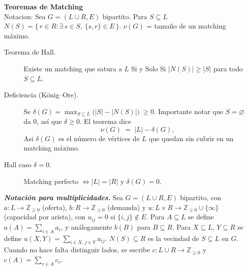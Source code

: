 \textbf{Teoremas de Matching}\\
Notacion:  Sea $G=(L\cup R,E)$ bipartito. Para $S\subseteq L$
    $ N(S)=\{\,r\in R : \exists\, s\in S,\ \{s,r\}\in E\,\} $.
    $\nu(G)$ = tama\~no de un matching m\'aximo. 



\begin{description}
\item[Teorema de Hall.]
    Existe un matching que satura a $L$
    Si y Solo Si $|N(S)|\ge |S|$ para todo $S\subseteq L$.
\item[Deficiencia (K\"onig--Ore).] Se $
    \delta(G)=\max_{S\subseteq L}\bigl(|S|-|N(S)|\bigr)\ \ge 0 $. Importante notar que $S=\varnothing$ da $0$, as\'i que $\delta\ge 0$. El teorema dice
    \[
    \nu(G)\;=\;|L|-\delta(G),
    \]
    Asi $\delta(G)$ es el n\'umero de
    v\'ertices de $L$ que quedan sin cubrir en un matching m\'aximo.
\item[Hall caso $\delta = 0$.] Matching perfecto $\iff |L|=|R|$ y $\delta(G)=0$.\\
\end{description}



\textit{\textbf{Notaci\'on para multiplicidades.}}
Sea $G=(L\cup R,E)$ bipartito, con $a:L\to\mathbb{Z}_{\ge0}$ (oferta),
$b:R\to\mathbb{Z}_{\ge0}$ (demanda) y $u:L\times R\to\mathbb{Z}_{\ge0}\cup\{\infty\}$
(capacidad por arista), con $u_{ij}=0$ si $\{i,j\}\notin E$.
Para $A\subseteq L$ se define $a(A)=\sum_{i\in A}a_i$, y an\'alogamente $b(B)$ para $B\subseteq R$.
Para $X\subseteq L$, $Y\subseteq R$ se define $u(X,Y)=\sum_{i\in X,\,j\in Y}u_{ij}$.
$N(S)\subseteq R$ es la vecindad de $S\subseteq L$ en $G$.
Cuando no hace falta distinguir lados, se escribe $c:L\cup R\to\mathbb{Z}_{\ge0}$ y
$c(A)=\sum_{v\in A}c_v$.



